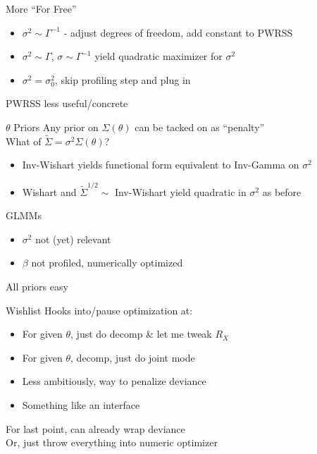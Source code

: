 \documentclass{beamer}
\begin{document}
\begin{frame}{More ``For Free''}
\begin{itemize}
\item
$\sigma^2 \sim \Gamma^{-1}$ - adjust degrees of freedom, add constant
to PWRSS
\item
$\sigma^2 \sim \Gamma$, $\sigma \sim \Gamma^{-1}$ yield quadratic
maximizer for $\sigma^2$
\item
$\sigma^2 = \sigma^2_0$, skip profiling step and plug in
\end{itemize}
\vspace{0.1in}
PWRSS less useful/concrete
\end{frame}

\begin{frame}{$\theta$ Priors}
Any prior on $\Sigma(\theta)$ can be tacked on as ``penalty'' \\
\vspace{0.1in}
What of $\tilde\Sigma = \sigma^2 \Sigma(\theta)$?
\vspace{0.1in}
\begin{itemize}
\item Inv-Wishart yields functional form equivalent to Inv-Gamma on
  $\sigma^2$
\item Wishart and $\tilde\Sigma^{1/2} \sim$ Inv-Wishart yield
  quadratic in $\sigma^2$ as before
\end{itemize}
\end{frame}

\begin{frame}{GLMMs}
\begin{itemize}
\item $\sigma^2$ not (yet) relevant
\item $\beta$ not profiled, numerically optimized
\end{itemize}
All priors easy
\end{frame}

\begin{frame}{Wishlist}
Hooks into/pause optimization at:
\begin{itemize}
\item For given $\theta$, just do decomp \& let me tweak $R_X$
\item For given $\theta$, decomp, just do joint mode
\item Less ambitiously, way to penalize deviance
\item Something like an interface
\end{itemize}
\vspace{0.1in}
For last point, can already wrap deviance \\ \vspace{0.15in}
Or, just throw everything into numeric optimizer
\end{frame}
\end{document}
